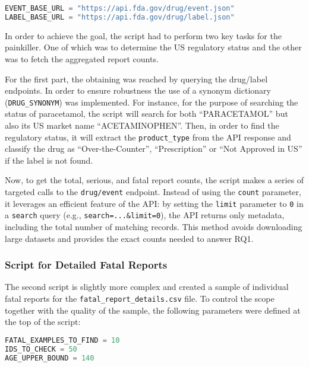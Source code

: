 \begin{lstlisting}[language=Python, caption={API base URLs defined in the script.}, label={lst:api_urls}, captionpos=b]
EVENT_BASE_URL = "https://api.fda.gov/drug/event.json"
LABEL_BASE_URL = "https://api.fda.gov/drug/label.json"
\end{lstlisting}

In order to achieve the goal, the script had to perform two key tasks for the painkiller. One of which was to determine the US regulatory status and the other was to fetch the aggregated report counts. 

For the first part, the obtaining was reached by querying the drug/label endpoints. In order to ensure robustness the use of a synonym dictionary (\texttt{DRUG\_SYNONYM}) was implemented. For instance, for the purpose of searching the status of paracetamol, the script will search for both “PARACETAMOL” but also its US market name “ACETAMINOPHEN”. Then, in order to find the regulatory status, it will extract the \texttt{product\_type} from the API response and classify the drug as “Over-the-Counter”, “Prescription” or “Not Approved in US” if the label is not found. 

Now, to get the total, serious, and fatal report counts, the script makes a series of targeted calls to the \texttt{drug/event} endpoint. Instead of using the \texttt{count} parameter, it leverages an efficient feature of the API: by setting the \texttt{limit} parameter to \texttt{0} in a \texttt{search} query (e.g., \texttt{search=...\&limit=0}), the API returns only metadata, including the total number of matching records. This method avoids downloading large datasets and provides the exact counts needed to answer RQ1.
\subsubsection{Script for Detailed Fatal Reports}
The second script is slightly more complex and created a sample of individual fatal reports for the \nolinkurl{fatal_report_details.csv} file. To control the scope together with the quality of the sample, the following parameters were defined at the top of the script:

\begin{lstlisting}[language=Python, caption={Key parameters for fatal report sampling.}, label={lst:fatal_params}, captionpos=b]
FATAL_EXAMPLES_TO_FIND = 10
IDS_TO_CHECK = 50
AGE_UPPER_BOUND = 140
\end{lstlisting}

